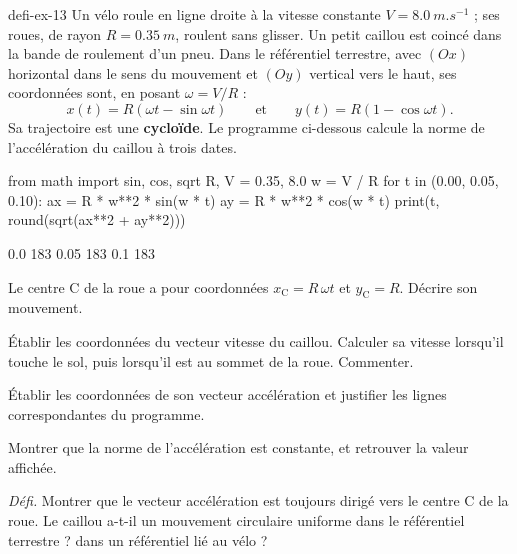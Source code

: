 \begin{blocEdition}{defi-ex-13}
Un vélo roule en ligne droite à la vitesse constante $V=\qty{8,0}{m.s^{-1}}$ ; ses roues, de rayon $R=\qty{0,35}{m}$, roulent
sans glisser. Un petit caillou est coincé dans la bande de roulement d'un pneu. Dans le référentiel terrestre, avec
$(Ox)$ horizontal dans le sens du mouvement et $(Oy)$ vertical vers le haut, ses coordonnées sont, en posant
$\omega=V/R$ :
\[x(t)=R\left(\omega t-\sin\omega t\right)\qquad\text{et}\qquad y(t)=R\left(1-\cos\omega t\right).\]
Sa trajectoire est une \textbf{cycloïde}. Le programme ci-dessous calcule la norme de l'accélération du caillou à trois
dates.
\begin{codecote}[0.62]
\begin{pythoncol}
from math import sin, cos, sqrt
R, V = 0.35, 8.0
w = V / R
for t in (0.00, 0.05, 0.10):
    ax = R * w**2 * sin(w * t)
    ay = R * w**2 * cos(w * t)
    print(t, round(sqrt(ax**2 + ay**2)))
\end{pythoncol}
\cote
\begin{consolecol}
0.0 183
0.05 183
0.1 183
\end{consolecol}
\end{codecote}
\begin{questions}
\item Le centre C de la roue a pour coordonnées $x_\mathrm{C}=R\,\omega t$ et $y_\mathrm{C}=R$. Décrire son mouvement.
\item Établir les coordonnées du vecteur vitesse du caillou. Calculer sa vitesse lorsqu'il touche le sol, puis
lorsqu'il est au sommet de la roue. Commenter.
\item Établir les coordonnées de son vecteur accélération et justifier les lignes correspondantes du programme.
\item Montrer que la norme de l'accélération est constante, et retrouver la valeur affichée.
\item \textit{Défi.} Montrer que le vecteur accélération est toujours dirigé vers le centre C de la roue. Le caillou
a-t-il un mouvement circulaire uniforme dans le référentiel terrestre ? dans un référentiel lié au vélo ?
\end{questions}
\end{blocEdition}


